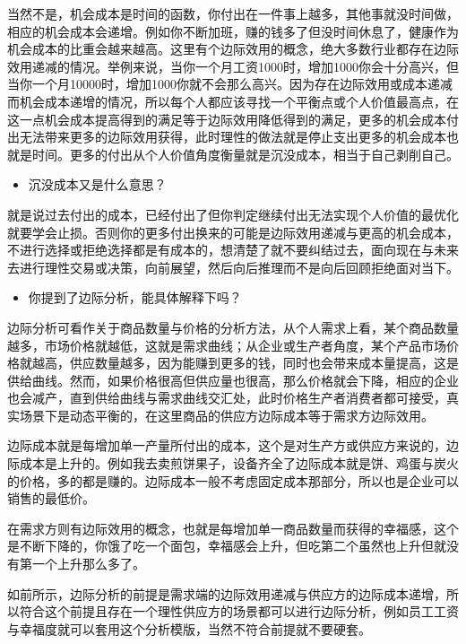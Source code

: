 \documentclass[
  letterpaper,
  DIV=11,
  numbers=noendperiod]{scrreprt}
\providecommand{\tightlist}{%
  \setlength{\itemsep}{0pt}\setlength{\parskip}{0pt}}\usepackage{longtable,booktabs,array}
\begin{document}
当然不是，机会成本是时间的函数，你付出在一件事上越多，其他事就没时间做，相应的机会成本会递增。例如你不断加班，赚的钱多了但没时间休息了，健康作为机会成本的比重会越来越高。这里有个边际效用的概念，绝大多数行业都存在边际效用递减的情况。举例来说，当你一个月工资1000时，增加1000你会十分高兴，但当你一个月10000时，增加1000你就不会那么高兴。因为存在边际效用或成本递减而机会成本递增的情况，所以每个人都应该寻找一个平衡点或个人价值最高点，在这一点机会成本提高得到的满足等于边际效用降低得到的满足，更多的机会成本付出无法带来更多的边际效用获得，此时理性的做法就是停止支出更多的机会成本也就是时间。更多的付出从个人价值角度衡量就是沉没成本，相当于自己剥削自己。

\begin{itemize}
\tightlist
\item
  沉没成本又是什么意思？
\end{itemize}

就是说过去付出的成本，已经付出了但你判定继续付出无法实现个人价值的最优化就要学会止损。否则你的更多付出换来的可能是边际效用递减与更高的机会成本，不进行选择或拒绝选择都是有成本的，想清楚了就不要纠结过去，面向现在与未来去进行理性交易或决策，向前展望，然后向后推理而不是向后回顾拒绝面对当下。

\begin{itemize}
\tightlist
\item
  你提到了边际分析，能具体解释下吗？
\end{itemize}

边际分析可看作关于商品数量与价格的分析方法，从个人需求上看，某个商品数量越多，市场价格就越低，这就是需求曲线；从企业或生产者角度，某个产品市场价格就越高，供应数量越多，因为能赚到更多的钱，同时也会带来成本量提高，这是供给曲线。然而，如果价格很高但供应量也很高，那么价格就会下降，相应的企业也会减产，直到供给曲线与需求曲线交汇处，此时价格生产者消费者都可接受，真实场景下是动态平衡的，在这里商品的供应方边际成本等于需求方边际效用。

边际成本就是每增加单一产量所付出的成本，这个是对生产方或供应方来说的，边际成本是上升的。例如我去卖煎饼果子，设备齐全了边际成本就是饼、鸡蛋与炭火的价格，多的都是赚的。边际成本一般不考虑固定成本那部分，所以也是企业可以销售的最低价。

在需求方则有边际效用的概念，也就是每增加单一商品数量而获得的幸福感，这个是不断下降的，你饿了吃一个面包，幸福感会上升，但吃第二个虽然也上升但就没有第一个上升那么多了。

如前所示，边际分析的前提是需求端的边际效用递减与供应方的边际成本递增，所以符合这个前提且存在一个理性供应方的场景都可以进行边际分析，例如员工工资与幸福度就可以套用这个分析模版，当然不符合前提就不要硬套。
\end{document}
